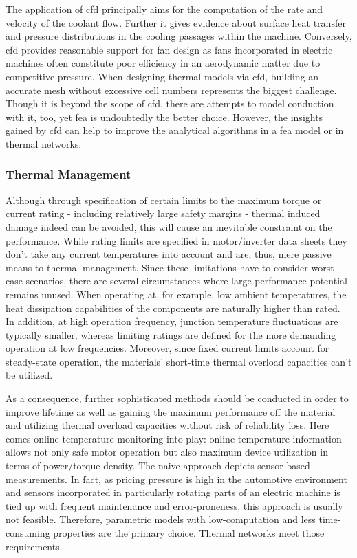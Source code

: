 The application of \gls{cfd} principally aims for the computation of the rate and velocity of the coolant flow.
Further it gives evidence about surface heat transfer and pressure distributions in the cooling passages within the machine.
Conversely, \gls{cfd} provides reasonable support for fan design as fans incorporated in electric machines often constitute poor efficiency in an aerodynamic matter due to competitive pressure.
When designing thermal models via \gls{cfd}, building an accurate mesh without excessive cell numbers represents the biggest challenge.
Though it is beyond the scope of \gls{cfd}, there are attempts to model conduction with it, too, yet \gls{fea} is undoubtedly the better choice.
However, the insights gained by \gls{cfd} can help to improve the analytical algorithms in a \gls{fea} model or in thermal networks.

\subsubsection{Thermal Management}
Although through specification of certain limits to the maximum torque or current rating - including relatively large safety margins - thermal induced damage indeed can be avoided, this will cause an inevitable constraint on the performance.
While rating limits are specified in motor/inverter data sheets they don't take any current temperatures into account and are, thus, mere passive means to thermal management.
Since these limitations have to consider worst-case scenarios, there are several circumstances where large performance potential remains unused. 
When operating at, for example, low ambient temperatures, the heat dissipation capabilities of the components are naturally higher than rated.
In addition, at high operation frequency, junction temperature fluctuations are typically smaller, whereas limiting ratings are defined for the more demanding operation at low frequencies.
Moreover, since fixed current limits account for steady-state operation, the materials' short-time thermal overload capacities can't be utilized. 

As a consequence, further sophisticated methods should be conducted in order to improve lifetime as well as gaining the maximum performance off the material and utilizing thermal overload capacities without risk of reliability loss.
Here comes online temperature monitoring into play:
online temperature information allows not only safe motor operation but also maximum device utilization in terms of power/torque density.
The naive approach depicts sensor based measurements.
In fact, as pricing pressure is high in the automotive environment and sensors incorporated in particularly rotating parts of an electric machine is tied up with frequent maintenance and error-proneness, this approach is usually not feasible.
Therefore, parametric models with low-computation and less time-consuming properties are the primary choice.
Thermal networks meet those requirements.

